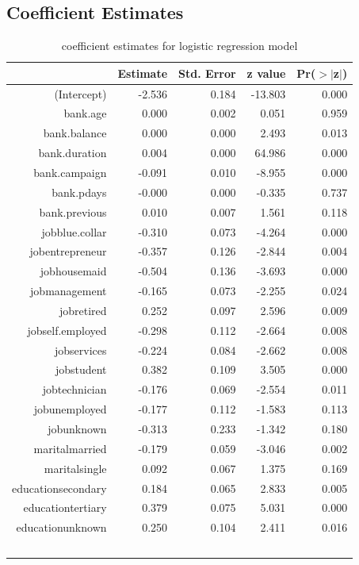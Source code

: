 \documentclass{article} %
\begin{document}
\subsection{Coefficient Estimates}
\begin{table}[h]
\caption{coefficient estimates for logistic regression model} 
\centering
{\small
\begin{tabular}{rrrrr}
  \hline
 & Estimate & Std. Error & z value & Pr($>$$|$z$|$) \\ 
  \hline
(Intercept) & -2.536 & 0.184 & -13.803 & 0.000 \\ 
  bank.age & 0.000 & 0.002 & 0.051 & 0.959 \\ 
  bank.balance & 0.000 & 0.000 & 2.493 & 0.013 \\ 
  bank.duration & 0.004 & 0.000 & 64.986 & 0.000 \\ 
  bank.campaign & -0.091 & 0.010 & -8.955 & 0.000 \\ 
  bank.pdays & -0.000 & 0.000 & -0.335 & 0.737 \\ 
  bank.previous & 0.010 & 0.007 & 1.561 & 0.118 \\ 
  jobblue.collar & -0.310 & 0.073 & -4.264 & 0.000 \\ 
  jobentrepreneur & -0.357 & 0.126 & -2.844 & 0.004 \\ 
  jobhousemaid & -0.504 & 0.136 & -3.693 & 0.000 \\ 
  jobmanagement & -0.165 & 0.073 & -2.255 & 0.024 \\ 
  jobretired & 0.252 & 0.097 & 2.596 & 0.009 \\ 
  jobself.employed & -0.298 & 0.112 & -2.664 & 0.008 \\ 
  jobservices & -0.224 & 0.084 & -2.662 & 0.008 \\ 
  jobstudent & 0.382 & 0.109 & 3.505 & 0.000 \\ 
  jobtechnician & -0.176 & 0.069 & -2.554 & 0.011 \\ 
  jobunemployed & -0.177 & 0.112 & -1.583 & 0.113 \\ 
  jobunknown & -0.313 & 0.233 & -1.342 & 0.180 \\ 
  maritalmarried & -0.179 & 0.059 & -3.046 & 0.002 \\ 
  maritalsingle & 0.092 & 0.067 & 1.375 & 0.169 \\ 
  educationsecondary & 0.184 & 0.065 & 2.833 & 0.005 \\ 
  educationtertiary & 0.379 & 0.075 & 5.031 & 0.000 \\ 
  educationunknown & 0.250 & 0.104 & 2.411 & 0.016 \\ 
$$
\end{tabular}}
\end{table}
\end{document}
